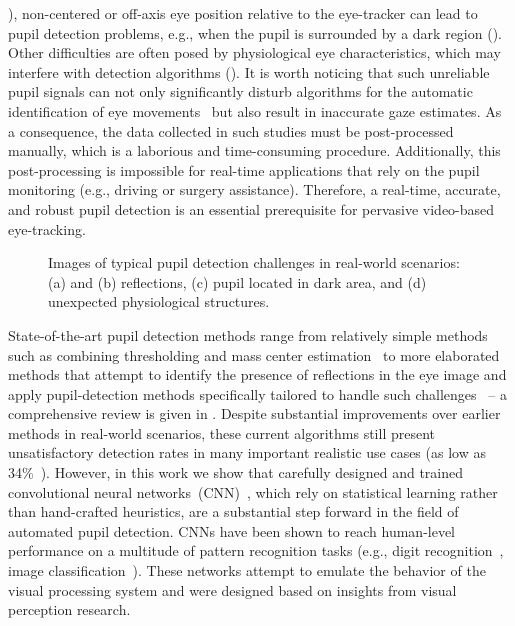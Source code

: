 ), non-centered or off-axis eye position relative to the
eye-tracker can lead to pupil detection problems, e.g., when the pupil is
surrounded by a dark region ().
Other difficulties are often posed by physiological eye characteristics, which
may interfere with detection algorithms ().
It is worth noticing that such unreliable pupil signals can not only
significantly disturb algorithms for the automatic identification of eye
movements~\citet{santini2016bayesian} but also result in inaccurate gaze estimates.
As a consequence, the data collected in such studies must be post-processed
manually, which is a laborious and time-consuming procedure.
Additionally, this post-processing is impossible for real-time applications that
rely on the pupil monitoring (e.g., driving or surgery assistance).
Therefore, a real-time, accurate, and robust pupil detection is an essential
prerequisite for pervasive video-based eye-tracking.
\begin{figure}[h]
	\begin{center}
		\caption{
			Images of typical pupil detection challenges in
			real-world scenarios: (a) and (b) reflections, (c) pupil
			located in dark area, and (d) unexpected physiological structures.
		}
	\end{center}
\end{figure}

State-of-the-art pupil detection methods range from relatively simple methods
such as combining thresholding and mass center
estimation~\citet{perez2003precise} to more elaborated methods that attempt to
identify the presence of reflections in the eye image and apply
pupil-detection methods specifically tailored to handle such challenges~\citet{fuhl2015excuse} -- a
comprehensive review is given in .
Despite substantial improvements over earlier methods in real-world scenarios,
these current algorithms still present unsatisfactory detection rates in many
important realistic use cases (as low as 34\%~\citet{fuhl2015excuse}).
However, in this work we show that carefully designed and trained convolutional
neural networks~(CNN)~\citet{domingos2012few,lecun1998gradient}, which rely on
statistical learning rather than hand-crafted heuristics, are a substantial step
forward in the field of automated pupil detection.
CNNs have been shown to reach human-level performance on a multitude of pattern
recognition tasks (e.g., digit recognition~\citet{ciresan2012multi}, image
classification~\citet{krizhevsky2012imagenet}).
These networks attempt to emulate the behavior of the visual processing system
and were designed based on insights from visual perception research.

